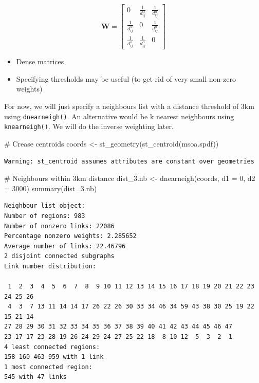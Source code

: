 \documentclass[
  letterpaper,
  DIV=11,
  numbers=noendperiod]{scrreprt}
\newenvironment{Shaded}{\begin{snugshade}}{\end{snugshade}}
\newcommand{\AttributeTok}[1]{\textcolor[rgb]{0.40,0.45,0.13}{#1}}
\newcommand{\CommentTok}[1]{\textcolor[rgb]{0.37,0.37,0.37}{#1}}
\newcommand{\DecValTok}[1]{\textcolor[rgb]{0.68,0.00,0.00}{#1}}
\newcommand{\FunctionTok}[1]{\textcolor[rgb]{0.28,0.35,0.67}{#1}}
\newcommand{\NormalTok}[1]{\textcolor[rgb]{0.00,0.23,0.31}{#1}}
\newcommand{\OtherTok}[1]{\textcolor[rgb]{0.00,0.23,0.31}{#1}}
\begin{document}
\[
        \begin{equation} 
        \boldsymbol{\mathbf{W}} = \begin{bmatrix} 
            0 & \frac{1}{d_{ij}^\alpha} & \frac{1}{d_{ij}^\alpha}  \\
            \frac{1}{d_{ij}^\alpha} & 0 & \frac{1}{d_{ij}^\alpha}  \\
            \frac{1}{d_{ij}^\alpha} & \frac{1}{d_{ij}^\alpha} & 0  
            \end{bmatrix}   \nonumber
        \end{equation}
\]

\begin{itemize}
\item
  Dense matrices
\item
  Specifying thresholds may be useful (to get rid of very small non-zero
  weights)
\end{itemize}

For now, we will just specify a neighbours list with a distance
threshold of 3km using \texttt{dnearneigh()}. An alternative would be k
nearest neighbours using \texttt{knearneigh()}. We will do the inverse
weighting later.

\begin{Shaded}
\begin{Highlighting}[]
\CommentTok{\# Crease centroids}
\NormalTok{coords }\OtherTok{\textless{}{-}} \FunctionTok{st\_geometry}\NormalTok{(}\FunctionTok{st\_centroid}\NormalTok{(msoa.spdf))}
\end{Highlighting}
\end{Shaded}

\begin{verbatim}
Warning: st_centroid assumes attributes are constant over geometries
\end{verbatim}

\begin{Shaded}
\begin{Highlighting}[]
\CommentTok{\# Neighbours within 3km distance}
\NormalTok{dist\_3.nb }\OtherTok{\textless{}{-}} \FunctionTok{dnearneigh}\NormalTok{(coords, }\AttributeTok{d1 =} \DecValTok{0}\NormalTok{, }\AttributeTok{d2 =} \DecValTok{3000}\NormalTok{)}
\FunctionTok{summary}\NormalTok{(dist\_3.nb)}
\end{Highlighting}
\end{Shaded}

\begin{verbatim}
Neighbour list object:
Number of regions: 983 
Number of nonzero links: 22086 
Percentage nonzero weights: 2.285652 
Average number of links: 22.46796 
2 disjoint connected subgraphs
Link number distribution:

 1  2  3  4  5  6  7  8  9 10 11 12 13 14 15 16 17 18 19 20 21 22 23 24 25 26 
 4  3  7 13 11 14 14 17 26 22 26 30 33 34 46 34 59 43 38 30 25 19 22 15 21 14 
27 28 29 30 31 32 33 34 35 36 37 38 39 40 41 42 43 44 45 46 47 
23 17 17 23 28 19 26 24 29 24 27 25 22 18  8 10 12  5  3  2  1 
4 least connected regions:
158 160 463 959 with 1 link
1 most connected region:
545 with 47 links
\end{verbatim}
\end{document}
